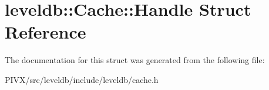 \hypertarget{structleveldb_1_1_cache_1_1_handle}{}\section{leveldb\+:\+:Cache\+:\+:Handle Struct Reference}
\label{structleveldb_1_1_cache_1_1_handle}


The documentation for this struct was generated from the following file\+:\begin{DoxyCompactItemize}
\item 
P\+I\+V\+X/src/leveldb/include/leveldb/cache.\+h\end{DoxyCompactItemize}
